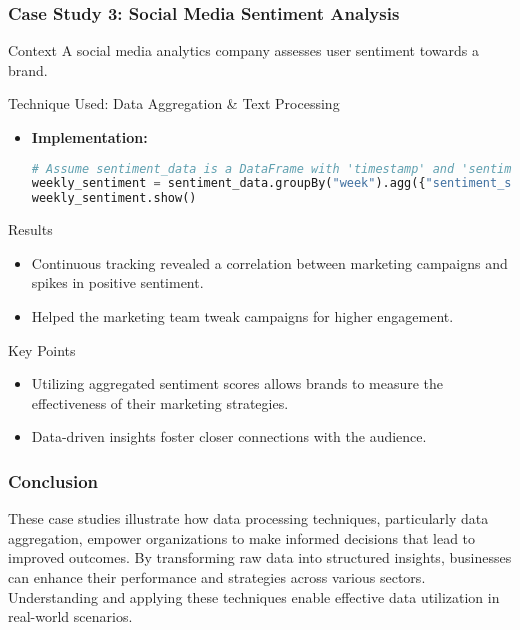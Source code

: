 \documentclass[aspectratio=169]{beamer}
\begin{document}
\begin{frame}[fragile]
    \frametitle{Case Study 3: Social Media Sentiment Analysis}
    \begin{block}{Context}
        A social media analytics company assesses user sentiment towards a brand.
    \end{block}
    
    \begin{block}{Technique Used: Data Aggregation \& Text Processing}
        \begin{itemize}
            \item \textbf{Implementation:}
            \begin{lstlisting}[language=Python, caption=Data Aggregation Code Example]
# Assume sentiment_data is a DataFrame with 'timestamp' and 'sentiment_score'
weekly_sentiment = sentiment_data.groupBy("week").agg({"sentiment_score": "avg"})
weekly_sentiment.show()
            \end{lstlisting}
        \end{itemize}
    \end{block}
    
    \begin{block}{Results}
        \begin{itemize}
            \item Continuous tracking revealed a correlation between marketing campaigns and spikes in positive sentiment.
            \item Helped the marketing team tweak campaigns for higher engagement.
        \end{itemize}
    \end{block}
    
    \begin{block}{Key Points}
        \begin{itemize}
            \item Utilizing aggregated sentiment scores allows brands to measure the effectiveness of their marketing strategies.
            \item Data-driven insights foster closer connections with the audience.
        \end{itemize}
    \end{block}
\end{frame}

\begin{frame}[fragile]
    \frametitle{Conclusion}
    These case studies illustrate how data processing techniques, particularly data aggregation, empower organizations to make informed decisions that lead to improved outcomes. By transforming raw data into structured insights, businesses can enhance their performance and strategies across various sectors. Understanding and applying these techniques enable effective data utilization in real-world scenarios.
\end{frame}
\end{document}
